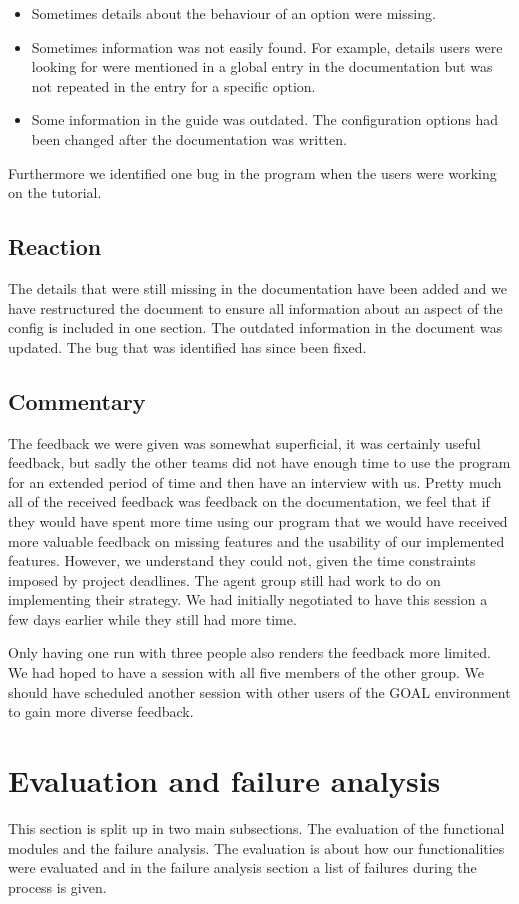 \documentclass[11pt]{article}
\begin{document}
\begin{itemize}
	\item Sometimes details about the behaviour of an option were missing.
	\item Sometimes information was not easily found. For example, details users were looking for were mentioned in a global entry in the documentation but was not repeated in the entry for a specific option.
	\item Some information in the guide was outdated. The configuration options had been changed after the documentation was written.
\end{itemize}

Furthermore we identified one bug in the program when the users were working on the tutorial. 
\subsection{Reaction}
The details that were still missing in the documentation have been added and we have restructured the document to ensure all information about an aspect of the config is included in one section. The outdated information in the document was updated. The bug that was identified has since been fixed.

\subsection{Commentary}
The feedback we were given was somewhat superficial, it was certainly useful feedback, but sadly the other teams did not have enough time to use the program for an extended period of time and then have an interview with us. Pretty much all of the received feedback was feedback on the documentation, we feel that if they would have spent more time using our program that we would have received more valuable feedback on missing features and the usability of our implemented features. However, we understand they could not, given the time constraints imposed by project deadlines. The agent group still had work to do on implementing their strategy. We had initially negotiated to have this session a few days earlier while they still had more time.

Only having one run with three people also renders the feedback more limited. We had hoped to have a session with all five members of the other group. We should have scheduled another session with other users of the GOAL environment to gain more diverse feedback.

\section{Evaluation and failure analysis}
This section is split up in two main subsections. The evaluation of the functional modules and the failure analysis. The evaluation is about how our functionalities were evaluated and in the failure analysis section a list of failures during the process is given.
\end{document}
